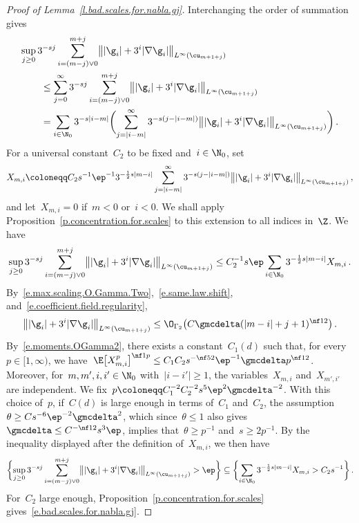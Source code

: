 \documentclass[11pt]{amsart}
\begin{document}
\begin{proof}[{Proof of Lemma~\ref{l.bad.scales.for.nabla.gj}}]
Interchanging the order of summation gives
\begin{align*}
	\lefteqn{
	\sup_{j \geq 0}
	3^{-sj}
	\sum_{i = (m-j)\vee0}^{m+j}
	\bigl\|  | \g_i |
	+
	3^{i} | \nabla \g_{i}| \bigr\|_{L^\infty(\cu_{m+1+j})}
	} \qquad &
	\notag \\ &
	\leq
	\sum_{j = 0}^\infty
	3^{-sj}
	\sum_{i = (m-j)\vee0}^{m+j}
	\bigl\|  | \g_i |
	+
	3^{i} | \nabla \g_{i}| \bigr\|_{L^\infty(\cu_{m+1+j})}
	\notag \\ &
	=
	\sum_{i \in \N_0}
	3^{-s|i-m|}
	\biggl(
	\sum_{j = |i-m|}^\infty
	3^{-s(j - |i-m|)}
	\bigl\|  | \g_i |
	+
	3^{i} | \nabla \g_{i}| \bigr\|_{L^\infty(\cu_{m+1+j})}
	\biggr)
	\,.
\end{align*}
For a universal constant~$C_2$ to be fixed and~$i\in\N_0$, set
\begin{equation*}
	X_{m,i}
	\coloneqq
	C_2 s^{-1} \ep^{-1} 3^{-\frac{1}{2}s|m-i|}
	\sum_{j = |i-m|}^\infty
	3^{-s(j - |i-m|)}
	\bigl\|  | \g_i |
	+
	3^{i} | \nabla \g_{i}| \bigr\|_{L^\infty(\cu_{m+1+j})}
	\,,
\end{equation*}
and let~$X_{m,i}=0$ if~$m<0$ or~$i<0$. We shall apply Proposition~\ref{p.concentration.for.scales} to this extension to all indices in~$\Z$. We have
\begin{equation*}
	\sup_{j \geq 0}
	3^{-sj}
	\sum_{i = (m-j)\vee0}^{m+j}
	\bigl\|  | \g_i |
	+
	3^{i} | \nabla \g_{i}| \bigr\|_{L^\infty(\cu_{m+1+j})}
	\leq
	C_2^{-1} s \ep  \sum_{i \in \N_0}
	3^{-\frac{1}{2} s| m-i|} X_{m,i}
	\,.
\end{equation*}
By~\eqref{e.max.scaling.O.Gamma.Two},~\eqref{e.same.law.shift}, and~\eqref{e.coefficient.field.regularity},
\begin{equation*}
	\bigl\|  | \g_i |
	+
	3^{i} | \nabla \g_{i}| \bigr\|_{L^\infty(\cu_{m+1+j})}
	\leq
	\O_{\Gamma_2}\bigl( C\gmcdelta (|m- i| + j + 1)^{\nf 12} \bigr)
	\,.
\end{equation*}
By~\eqref{e.moments.OGamma2}, there exists a constant~$C_1(d)$ such that, for every~$p \in [1,\infty)$, we have~$\E\bigl[ X_{m,i}^p  \bigr]^{\nf 1p} \leq C_1 C_2 s^{-\nf 52} \ep^{-1} \gmcdelta p^{\nf 12}$. Moreover, for~$m,m',i,i' \in \N_0$ with~$|i-i'| \geq 1$, the variables~$X_{m,i}$ and~$X_{m',i'}$ are independent. We fix~$p \coloneqq C_1^{-2} C_2^{-2} s^5 \ep^2 \gmcdelta^{-2}$.  With this choice of~$p$, if~$C(d)$ is large enough in terms of~$C_1$ and~$C_2$, the assumption~$\theta \geq C s^{-6} \ep^{-2} \gmcdelta^{2}$, which since~$\theta\leq1$ also gives~$\gmcdelta \leq C^{-\nf12} s^{3} \ep$, implies that~$\theta \geq p^{-1}$ and~$s \geq 2 p^{-1}$. By the inequality displayed after the definition of~$X_{m,i}$, we then have
\begin{equation*}
	\biggl\{
	\sup_{j \geq 0}
	3^{-sj}
	\sum_{i = (m-j)\vee0}^{m+j}
	\bigl\|  | \g_i |
	+
	3^{i} | \nabla \g_{i}| \bigr\|_{L^\infty(\cu_{m+1+j})} >  \ep
	\biggr\}
	\subseteq
	\biggl\{
	\sum_{i \in \N_0} 3^{-\frac{1}{2} s|m-i|} X_{m,i}  >  C_2 s^{-1} \biggr\}
	\,.
\end{equation*}
For~$C_2$ large enough, Proposition~\ref{p.concentration.for.scales} gives~\eqref{e.bad.scales.for.nabla.gj}.
\end{proof}
\end{document}
